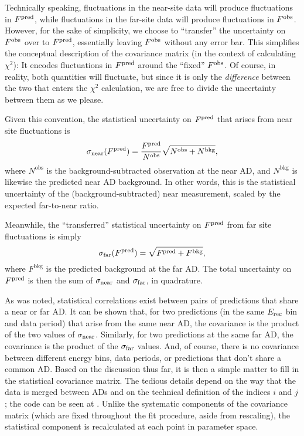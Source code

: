 \documentclass[../thesis.tex]{subfiles}
\begin{document}
Technically speaking, fluctuations in the near-site data will produce fluctuations in $F^{\mathrm{pred}}$, while fluctuations in the far-site data will produce fluctuations in $F^{\mathrm{obs}}$. However, for the sake of simplicity, we choose to ``transfer'' the uncertainty on $F^{\mathrm{obs}}$ over to $F^{\mathrm{pred}}$, essentially leaving $F^{\mathrm{obs}}$ without any error bar. This simplifies the conceptual description of the covariance matrix (in the context of calculating $\chi^2$): It encodes fluctuations in $F^{\mathrm{pred}}$ around the ``fixed'' $F^{\mathrm{obs}}$. Of course, in reality, both quantities will fluctuate, but since it is only the \emph{difference} between the two that enters the $\chi^2$ calculation, we are free to divide the uncertainty between them as we please.

Given this convention, the statistical uncertainty on $F^{\mathrm{pred}}$ that arises from near site fluctuations is
\begin{equation}
  \sigma_{\mathrm{near}}(F^{\mathrm{pred}}) = \frac{F^{\mathrm{pred}}}{N^{\mathrm{obs}}} \sqrt{N^{\mathrm{obs}} + N^{\mathrm{bkg}}},
\end{equation}
where $N^{\mathrm{obs}}$ is the background-subtracted observation at the near AD, and $N^{\mathrm{bkg}}$ is likewise the predicted near AD background. In other words, this is the statistical uncertainty of the (background-subtracted) near measurement, scaled by the expected far-to-near ratio.

Meanwhile, the ``transferred'' statistical uncertainty on $F^{\mathrm{pred}}$ from far site fluctuations is simply
\begin{equation}
  \sigma_{\mathrm{far}}(F^{\mathrm{pred}}) = \sqrt{F^{\mathrm{pred}} + F^{\mathrm{bkg}}},
\end{equation}
where $F^{\mathrm{bkg}}$ is the predicted background at the far AD. The total uncertainty on $F^{\mathrm{pred}}$ is then the sum of $\sigma_{\mathrm{near}}$ and $\sigma_{\mathrm{far}}$, in quadrature.

As was noted, statistical correlations exist between pairs of predictions that share a near or far AD. It can be shown
that, for two predictions (in the same $E_\mathrm{rec}$ bin and data period) that arise from the same near AD, the covariance is the product of the two values of $\sigma_{\mathrm{near}}$. Similarly, for two predictions at the same far AD, the covariance is the product of the $\sigma_{\mathrm{far}}$ values. And, of course, there is no covariance between different energy bins, data periods, or predictions that don't share a common AD. Based on the discussion thus far, it is then a simple matter to fill in the statistical covariance matrix. The tedious details depend on the way that the data is merged between ADs and on the technical definition of the indices $i$ and $j$; the code can be seen at \cite[ShapeFit/Predictor.C, Calculate(NearSite)StatError]{DybBerkFit}. Unlike the systematic components of the covariance matrix (which are fixed throughout the fit procedure, aside from rescaling), the statistical component is recalculated at each point in parameter space.
\end{document}
